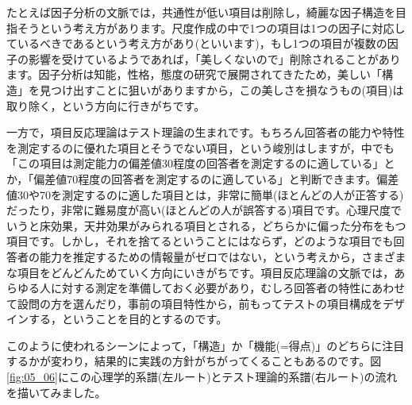 \documentclass{ltjsbook}
\begin{document}
たとえば因子分析の文脈では，共通性が低い項目は削除し，綺麗な因子構造を目指そうという考え方があります。尺度作成の中で1つの項目は1つの因子に対応しているべきであるという考え方があり(といいます)，もし1つの項目が複数の因子の影響を受けているようであれば，「美しくないので」削除されることがあります。因子分析は知能，性格，態度の研究で展開されてきたため，美しい「構造」を見つけ出すことに狙いがありますから，この美しさを損なうもの(項目)は取り除く，という方向に行きがちです。

一方で，項目反応理論はテスト理論の生まれです。もちろん回答者の能力や特性を測定するのに優れた項目とそうでない項目，という峻別はしますが，中でも「この項目は測定能力の偏差値30程度の回答者を測定するのに適している」とか，「偏差値70程度の回答者を測定するのに適している」と判断できます。偏差値30や70を測定するのに適した項目とは，非常に簡単(ほとんどの人が正答する)だったり，非常に難易度が高い(ほとんどの人が誤答する)項目です。心理尺度でいうと床効果，天井効果がみられる項目とされる，どちらかに偏った分布をもつ項目です。しかし，それを捨てるということにはならず，どのような項目でも回答者の能力を推定するための情報量がゼロではない，という考えから，さまざまな項目をどんどんためていく方向にいきがちです。項目反応理論の文脈では，あらゆる人に対する測定を準備しておく必要があり，むしろ回答者の特性にあわせて設問の方を選んだり，事前の項目特性から，前もってテストの項目構成をデザインする，ということを目的とするのです。

このように使われるシーンによって，「構造」か「機能(=得点)」のどちらに注目するかが変わり，結果的に実践の方針がちがってくることもあるのです。図\ref{fig:05_06}にこの心理学的系譜(左ルート)とテスト理論的系譜(右ルート)の流れを描いてみました。
\end{document}
